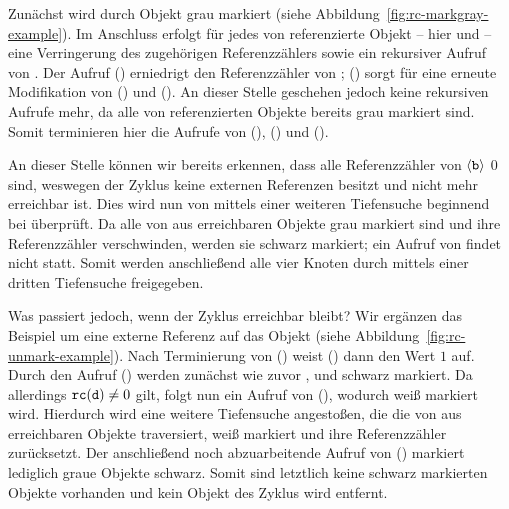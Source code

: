 Zunächst wird durch  Objekt  grau markiert (siehe Abbildung~\ref{fig:rc-markgray-example}).
Im Anschluss erfolgt für jedes von  referenzierte Objekt -- hier  und  -- eine Verringerung des zugehörigen Referenzzählers sowie ein rekursiver Aufruf von .
Der Aufruf () erniedrigt den Referenzzähler von ; () sorgt für eine erneute Modifikation von () und ().
An dieser Stelle geschehen jedoch keine rekursiven Aufrufe mehr, da alle von  referenzierten Objekte bereits grau markiert sind.
Somit terminieren hier die Aufrufe von (), () und ().

An dieser Stelle können wir bereits erkennen, dass alle Referenzzähler von $\left\langle\texttt{b}\right\rangle$ $0$ sind, weswegen der Zyklus keine externen Referenzen besitzt und nicht mehr erreichbar ist.
Dies wird nun von  mittels einer weiteren Tiefensuche beginnend bei  überprüft.
Da alle von  aus erreichbaren Objekte grau markiert sind und ihre Referenzzähler verschwinden, werden sie schwarz markiert; ein Aufruf von  findet nicht statt.
Somit werden anschließend alle vier Knoten durch  mittels einer dritten Tiefensuche freigegeben.

Was passiert jedoch, wenn der Zyklus erreichbar bleibt?
Wir ergänzen das Beispiel um eine externe Referenz auf das Objekt  (siehe Abbildung~\ref{fig:rc-unmark-example}).
Nach Terminierung von () weist () dann den Wert $1$ auf.
Durch den Aufruf () werden zunächst wie zuvor ,  und  schwarz markiert.
Da allerdings $\texttt{rc}(\texttt{d}) \neq 0$ gilt, folgt nun ein Aufruf von (), wodurch  weiß markiert wird.
Hierdurch wird eine weitere Tiefensuche angestoßen, die die von  aus erreichbaren Objekte traversiert, weiß markiert und ihre Referenzzähler zurücksetzt.
Der anschließend noch abzuarbeitende Aufruf von () markiert lediglich graue Objekte schwarz.
Somit sind letztlich keine schwarz markierten Objekte vorhanden und kein Objekt des Zyklus wird entfernt.

